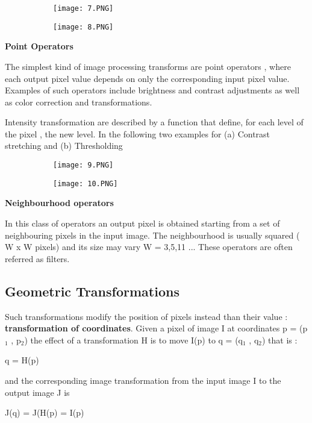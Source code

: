 \documentclass{article}
\begin{document}
 \begin{figure}[ht!]
  \centering
  \begin{subfigure}[b]{0.7\linewidth}
    \texttt{[image: 7.PNG]}
  \end{subfigure}
\end{figure}

 \begin{figure}[ht!]
  \centering
  \begin{subfigure}[b]{0.6\linewidth}
    \texttt{[image: 8.PNG]}
  \end{subfigure}
\end{figure}

\vspace{30mm}
\textbf{Point Operators}
\vspace{2mm}

The simplest kind of image processing transforms are point operators , where each output pixel value depends on only the corresponding input pixel value. Examples of such operators include brightness and contrast adjustments as well as color correction and transformations.

Intensity transformation are described by a function that define, for each level of the pixel , the new level. In the following two examples for (a) Contrast stretching and (b) Thresholding

 \begin{figure}[ht!]
  \centering
  \begin{subfigure}[b]{0.5\linewidth}
    \texttt{[image: 9.PNG]}
  \end{subfigure}
     \begin{subfigure}[b]{0.49\textwidth}
         \centering
         \texttt{[image: 10.PNG]}
     \end{subfigure}
\end{figure}

\vspace{2mm}
\textbf{Neighbourhood operators}
\vspace{2mm}

In this class of operators an output pixel is obtained starting from a set of neighbouring pixels in the input image. The neighbourhood is usually squared ( W x W pixels) and its size may vary W = 3,5,11 ...
These operators are often referred as filters.

\subsection{Geometric Transformations}
Such transformations modify the position of pixels instead than their value : \textbf{transformation of coordinates}.
Given a pixel of image I at coordinates p = (p$_1$ , p$_2$) the effect of a transformation H is to move I(p) to q = (q$_1$ , q$_2$) that is : 
\begin{center}
    q = H(p)
\end{center}
and the corresponding image transformation from the input image I to the output image J is 
\begin{center}
    J(q) = J(H(p) = I(p)
\end{center}
\end{document}
